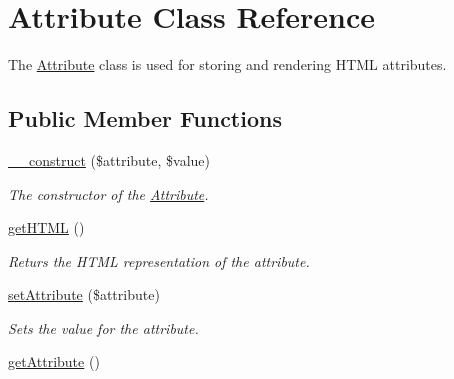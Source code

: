 \hypertarget{class_attribute}{
\section{Attribute Class Reference}
\label{class_attribute}
}


The \hyperlink{class_attribute}{Attribute} class is used for storing and rendering HTML attributes.  


\subsection*{Public Member Functions}
\begin{DoxyCompactItemize}
\item 
\hyperlink{class_attribute_af116db63b57df72f7fbb8feeb68738da}{\_\-\_\-construct} (\$attribute, \$value)
\begin{DoxyCompactList}\small\item\em The constructor of the \hyperlink{class_attribute}{Attribute}. \item\end{DoxyCompactList}\item 
\hyperlink{class_attribute_a28a8f2441ef0a717a17dda3a68e73d36}{getHTML} ()
\begin{DoxyCompactList}\small\item\em Returs the HTML representation of the attribute. \item\end{DoxyCompactList}\item 
\hyperlink{class_attribute_a502f8977a26a1a1a7cd051f1da91f27c}{setAttribute} (\$attribute)
\begin{DoxyCompactList}\small\item\em Sets the value for the attribute. \item\end{DoxyCompactList}\item 
\hypertarget{class_attribute_a89a8e6580935b5f7d2f41468c789bf66}{
\hyperlink{class_attribute_a89a8e6580935b5f7d2f41468c789bf66}{getAttribute} ()}
\label{class_attribute_a89a8e6580935b5f7d2f41468c789bf66}


\end{DoxyCompactItemize}
